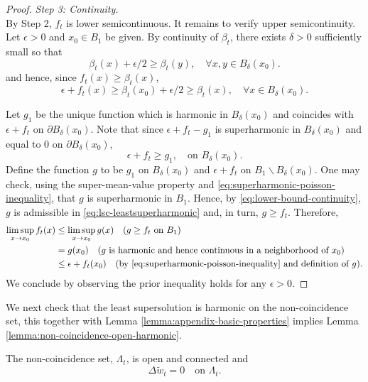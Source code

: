 \documentclass[12pt]{amsart}
\numberwithin{equation}{section}
\newcommand{\lssshift}[2]{\hyperref[eq:appendix-least-supersolution]{\tilde{w}^{#1}_{#2}}}
\newcommand{\cluster}[2]{\hyperref[eq:non-co-set]{\mathit{\Lambda}^{#1}_{#2}}}
\begin{document}
\begin{proof}
		{\it Step 3: Continuity.} \\
		By Step 2, $f_t$ is lower semicontinuous. It remains to verify upper semicontinuity. 
		Let $\epsilon > 0$ and $x_0 \in B_1$ be given. By continuity of $\beta_t$, there exists $\delta > 0$ sufficiently small so that
		\[
		\beta_t(x) +\epsilon/2 \geq \beta_t(y), \quad \forall x,y \in B_{\delta}(x_0).
		\]
		and hence, since $f_t(x) \geq \beta_t(x)$,
		\begin{equation} \label{eq:lower-bound-continuity}
		\epsilon + f_t(x) \geq \beta_t(x_0) + \epsilon/2 \geq \beta_t(x), \quad \forall x \in B_{\delta}(x_0).
		\end{equation}
		
		Let $g_1$ be the unique function which is harmonic in $B_{\delta}(x_0)$ and coincides with $\epsilon + f_t$ on $\partial B_{\delta}(x_0)$. 
		Note that since $\epsilon + f_t - g_1$ is superharmonic in $B_{\delta}(x_0)$ and equal to 0 on $\partial B_{\delta}(x_0)$, 
		\begin{equation} \label{eq:superharmonic-poisson-inequality}
		\epsilon + f_t \geq g_1, \quad \mbox{on $B_{\delta}(x_0)$}.
		\end{equation}
		Define the function $g$ to be $g_1$ on $B_{\delta}(x_0)$ and $\epsilon + f_t$ on $B_1 \backslash B_{\delta}(x_0)$.
		One may check, using the super-mean-value property and \eqref{eq:superharmonic-poisson-inequality}, that $g$ is superharmonic in $B_1$. Hence, by \eqref{eq:lower-bound-continuity}, $g$ is admissible in \eqref{eq:lsc-leastsuperharmonic} and, in turn, $g \geq f_t$.
		Therefore, 
		\begin{align*}
		\limsup_{x \to x_0} f_t(x) &\leq \limsup_{x \to x_0} g(x) \quad \mbox{($g \geq f_t$ on $B_1$)} \\
		&= g(x_0)\quad \mbox{($g$ is harmonic and hence continuous in a neighborhood of $x_0$)} \\
		&\leq \epsilon + f_t(x_0) \quad \mbox{(by \eqref{eq:superharmonic-poisson-inequality} and definition of $g$)}.
		\end{align*}
		We conclude by observing the prior inequality holds for any $\epsilon > 0$.
	\end{proof}
	
	We next check that the least supersolution is harmonic on the non-coincidence set, this together with Lemma \ref{lemma:appendix-basic-properties} implies
	Lemma \ref{lemma:non-coincidence-open-harmonic}. 
	\begin{lemma} \label{lemma:appendix-non-coincedence-open-harmonic}
		The non-coincidence set, ${\cluster{}{t}}$, is open and connected and
		\[
		\Delta \lssshift{}{t} = 0 \quad \mbox{on ${\cluster{}{t}}$}.
		\]
	\end{lemma}
	
\end{document}
